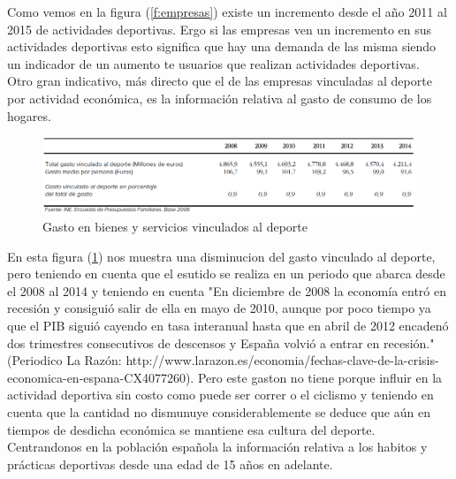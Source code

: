 \documentclass[a4paper, 11pt]{article}
\begin{document}
      Como vemos en la figura (\ref{f:empresas}) existe un incremento desde el
      año 2011 al 2015 de actividades deportivas. Ergo si las empresas ven un
      incremento en sus actividades deportivas esto significa que hay una demanda
      de las misma siendo un indicador de un aumento te usuarios que realizan
      actividades deportivas.\\

      Otro gran indicativo, más directo que el de las empresas vinculadas al
      deporte por actividad económica, es la información relativa al gasto de
      consumo de los hogares.\\

      \begin{figure}[H]
          \centering
          \includegraphics[width=\textwidth]{Gasto-en-bienes-y-servicios-vinculados-al-deporte}
          \caption{Gasto en bienes y servicios vinculados al deporte}
          \label{f:hogares}
      \end{figure}

      En esta figura (\ref{f:hogares}) nos muestra una disminucion del gasto
      vinculado al deporte, pero teniendo en cuenta que el esutido se realiza en
      un periodo que abarca desde el 2008 al 2014 y teniendo en cuenta "En
      diciembre de 2008 la economía entró en recesión y consiguió salir de ella
      en mayo de 2010, aunque por poco tiempo ya que el PIB siguió cayendo en
      tasa interanual hasta que en abril de 2012 encadenó dos trimestres
      consecutivos de descensos y España volvió a entrar en recesión." (Periodico
      La Razón: http://www.larazon.es/economia/fechas-clave-de-la-crisis-economica-en-espana-CX4077260).
      Pero este gaston no tiene porque influir en la actividad deportiva sin costo
      como puede ser correr o el ciclismo y teniendo en cuenta que la cantidad
      no dismunuye considerablemente se deduce que aún en tiempos de desdicha
      económica se mantiene esa cultura del deporte.\\

      Centrandonos en la población española la información relativa a los habitos
      y prácticas deportivas desde una edad de 15 años en adelante.\\
\end{document}
